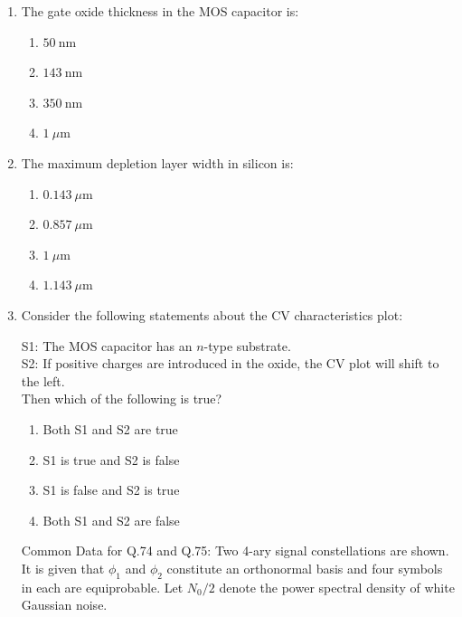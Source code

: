 \documentclass[journal,12pt,onecolumn]{IEEEtran}
\theoremstyle{remark}
\begin{document}
\begin{enumerate}
\item The gate oxide thickness in the MOS capacitor is: 
\hfill{}

\begin{multicols}{4}

\begin{enumerate}
  \item $50~\text{nm}$
  \item $143~\text{nm}$
  \item $350~\text{nm}$
  \item $1~\mu\text{m}$
\end{enumerate}
\end{multicols}

\item The maximum depletion layer width in silicon is:
\hfill{}

\begin{multicols}{4}
\begin{enumerate}
  \item $0.143~\mu\text{m}$
  \item $0.857~\mu\text{m}$
  \item $1~\mu\text{m}$
  \item $1.143~\mu\text{m}$
\end{enumerate}
\end{multicols}

\item Consider the following statements about the CV characteristics plot:

S1: The MOS capacitor has an $n$-type substrate. \\
S2: If positive charges are introduced in the oxide, the CV plot will shift to the left. \\
Then which of the following is true?
\hfill{}
\begin{enumerate}
  \item Both S1 and S2 are true
  \item S1 is true and S2 is false
  \item S1 is false and S2 is true
  \item Both S1 and S2 are false
\end{enumerate}


Common Data for Q.74 and Q.75: Two 4-ary signal constellations are shown. It is given that $\phi_1$ and $\phi_2$ constitute an orthonormal basis and four symbols in each are equiprobable. Let $N_0/2$ denote the power spectral density of white Gaussian noise. 


\end{enumerate}
\end{document}
